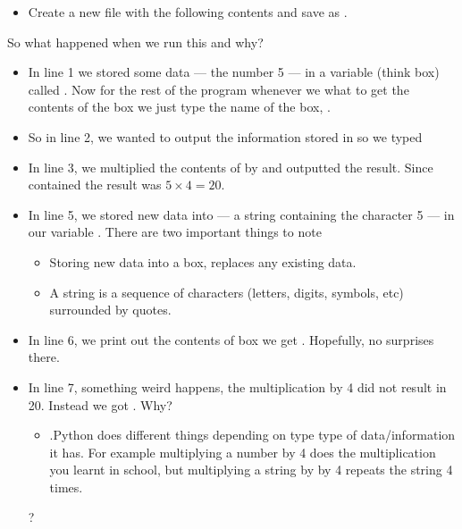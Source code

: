 \documentclass{coderdojo}
\begin{document}
\begin{itemize}
\item[\todoSymbol] \color{todo}
Create a new file with the following contents and save as . 
\end{itemize}


So what happened when we run this and why?

\begin{itemize}
\item[\pointSymbol]
In line 1 we stored some data --- the number 5 --- in a variable (think box) called .  Now for the rest of the program whenever we what to get the contents of the box  we just type the name of the box, .

\item[\pointSymbol]
So in line 2, we wanted to output the information stored in  so we typed 

\item[\pointSymbol]
In line 3, we multiplied the contents of  by  and outputted the result. Since  contained  the result was $5\times 4 = 20$.

\item[\pointSymbol]
In line 5, we stored new data into --- a string containing the character 5 --- in our variable 
.  There are two important things to note
\begin{itemize}
\item
Storing new data into a box, replaces any existing data.
\item
A string is a sequence of characters (letters, digits, symbols, etc)  surrounded by quotes. 
\end{itemize}

\item[\pointSymbol]
In line 6, we print out the contents of box  we get . Hopefully, no surprises there.
\item[\pointSymbol]
In line 7, something weird happens, the multiplication by 4 did not result in 20. Instead we got . Why?
\begin{itemize}
\item.Python does different things depending on type type of data/information it has.  For example multiplying a number by 4 does the multiplication you learnt in school, but multiplying a string by by 4 repeats the string 4 times.
\end{itemize}?
 
\end{itemize}
\end{document}
